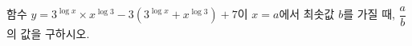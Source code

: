 함수 $y=3^{\log x}\times x^{\log 3}-3(3^{\log x}+x^{\log 3})+7$이 $x=a$에서 최솟값 $b$를 가질 때, $\dfrac{a}{b}$의 값을 구하시오.
